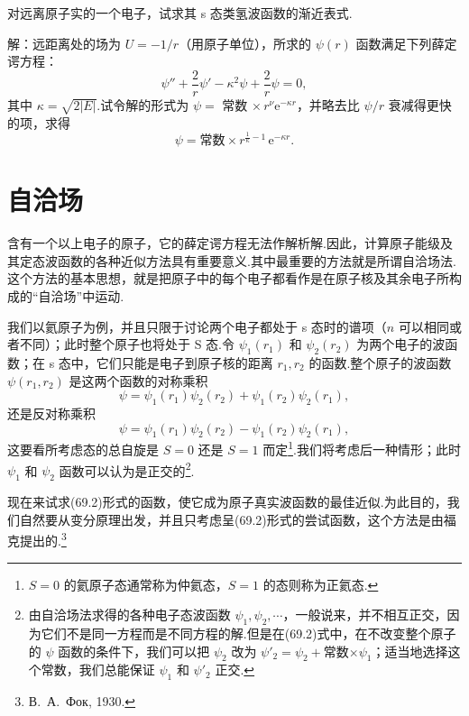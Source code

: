 \begin{xiti}

\quad 对远离原子实的一个电子，试求其 s 态类氢波函数的渐近表式.

解：远距离处的场为 $U=-1/r$（用原子单位），所求的 $\psi(r)$ 函数满足下列薛定谔方程：
\begin{equation*}
  \psi''+\frac{2}{r}\psi'-\kappa^{2}\psi+\frac{2}{r}\psi=0,
\end{equation*}
其中 $\kappa=\sqrt{2|E|}$.试令解的形式为 $\psi=$ 常数 $\times\, r^{\nu}\mathrm{e}^{-\kappa r}$，并略去比 $\psi/r$ 衰减得更快的项，求得
\begin{equation*}
  \psi=\text{常数}\times r^{\frac{1}{\kappa}-1}\,\mathrm{e}^{-\kappa r}.
\end{equation*}

\end{xiti}

\section{自洽场}

含有一个以上电子的原子，它的薛定谔方程无法作解析解.因此，计算原子能级及其定态波函数的各种近似方法具有重要意义.其中最重要的方法就是所谓自洽场法.这个方法的基本思想，就是把原子中的每个电子都看作是在原子核及其余电子所构成的“自洽场”中运动.

我们以氦原子为例，并且只限于讨论两个电子都处于 s 态时的谱项（$n$ 可以相同或者不同）；此时整个原子也将处于 S 态.令 $\psi_1(r_1)$ 和 $\psi_2(r_2)$ 为两个电子的波函数；在 s 态中，它们只能是电子到原子核的距离 $r_1,r_2$ 的函数.整个原子的波函数 $\psi(r_1,r_2)$ 是这两个函数的对称乘积
\begin{equation}
  \psi=\psi_1(r_1)\psi_2(r_2)+\psi_1(r_2)\psi_2(r_1),
\end{equation}
还是反对称乘积
\begin{equation}
  \psi=\psi_1(r_1)\psi_2(r_2)-\psi_1(r_2)\psi_2(r_1),
\end{equation}
这要看所考虑态的总自旋是 $S=0$ 还是 $S=1$ 而定\footnote{$S=0$ 的氦原子态通常称为仲氦态，$S=1$ 的态则称为正氦态.}.我们将考虑后一种情形；此时 $\psi_1$ 和 $\psi_2$ 函数可以认为是正交的\footnote{由自洽场法求得的各种电子态波函数 $\psi_1,\psi_2,\cdots$，一般说来，并不相互正交，因为它们不是同一方程而是不同方程的解.但是在(69.2)式中，在不改变整个原子的 $\psi$ 函数的条件下，我们可以把 $\psi_2$ 改为 $\psi'_2=\psi_2+$常数$\times\psi_1$；适当地选择这个常数，我们总能保证 $\psi_1$ 和 $\psi'_2$ 正交.}.

现在来试求(69.2)形式的函数，使它成为原子真实波函数的最佳近似.为此目的，我们自然要从变分原理出发，并且只考虑呈(69.2)形式的尝试函数，这个方法是由福克提出的.\footnote{В.~А.~Фок, 1930.}

